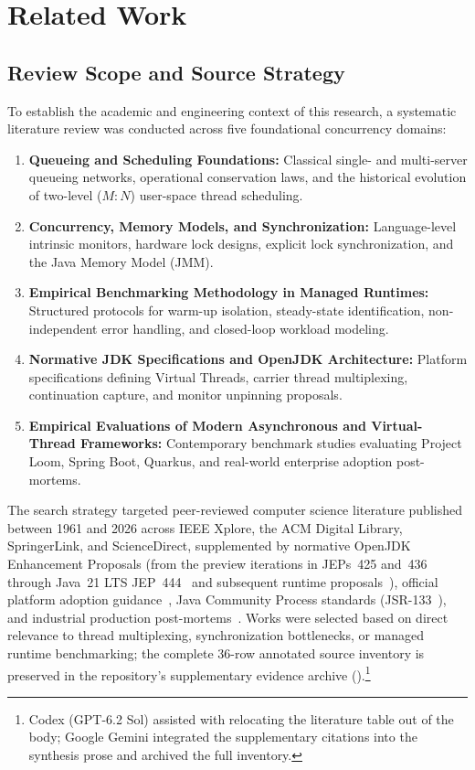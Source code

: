 \chapter{Related Work}
\label{ch:related-work}

\section{Review Scope and Source Strategy}
\label{sec:review-scope}

To establish the academic and engineering context of this research, a systematic literature review was conducted across five foundational concurrency domains:
\begin{enumerate}
  \item \textbf{Queueing and Scheduling Foundations:} Classical single- and multi-server queueing networks, operational conservation laws, and the historical evolution of two-level ($M:N$) user-space thread scheduling.
  \item \textbf{Concurrency, Memory Models, and Synchronization:} Language-level intrinsic monitors, hardware lock designs, explicit lock synchronization, and the Java Memory Model (JMM).
  \item \textbf{Empirical Benchmarking Methodology in Managed Runtimes:} Structured protocols for warm-up isolation, steady-state identification, non-independent error handling, and closed-loop workload modeling.
  \item \textbf{Normative JDK Specifications and OpenJDK Architecture:} Platform specifications defining Virtual Threads, carrier thread multiplexing, continuation capture, and monitor unpinning proposals.
  \item \textbf{Empirical Evaluations of Modern Asynchronous and Virtual-Thread Frameworks:} Contemporary benchmark studies evaluating Project Loom, Spring Boot, Quarkus, and real-world enterprise adoption post-mortems.
\end{enumerate}

The search strategy targeted peer-reviewed computer science literature published between 1961 and 2026 across IEEE Xplore, the ACM Digital Library, SpringerLink, and ScienceDirect, supplemented by normative OpenJDK Enhancement Proposals (from the preview iterations in JEPs~425 and~436~\cite{JEP425,JEP436} through Java~21 LTS JEP~444~\cite{JEP444} and subsequent runtime proposals~\cite{JEP491,JEP506}), official platform adoption guidance~\cite{OracleVTGuidance}, Java Community Process standards (JSR-133~\cite{Manson2005}), and industrial production post-mortems~\cite{DotCMS2024}. Works were selected based on direct relevance to thread multiplexing, synchronization bottlenecks, or managed runtime benchmarking; the complete 36-row annotated source inventory is preserved in the repository's supplementary evidence archive ().\footnote{Codex (GPT-6.2 Sol) assisted with relocating the literature table out of the body; Google Gemini integrated the supplementary citations into the synthesis prose and archived the full inventory.}

